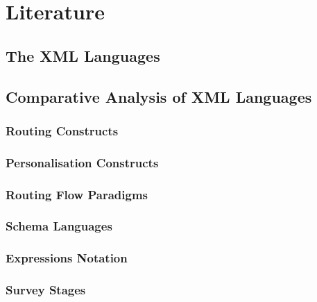 \chapter{Literature}\label{ch:literature}
	
	 
\section{The XML Languages}\label{sec:literature:xmlLanguages}
	

\section{Comparative Analysis of XML Languages}\label{sec:literature:comparativeAnalysis}
	
	\subsection{Routing Constructs}\label{sec:literature:routing}
		

	\subsection{Personalisation Constructs}\label{sec:literature:personalisation}
		

	\subsection{Routing Flow Paradigms}\label{sec:literature:flowParadigm}
		

	\subsection{Schema Languages}\label{sec:literature:schemaLanguages}
		

	\subsection{Expressions Notation}\label{sec:literature:expressionNotation}
		

	\subsection{Survey Stages}\label{sec:literature:surveyStages}
		
		

